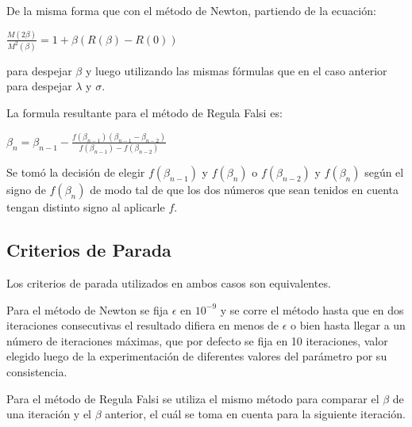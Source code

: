 De la misma forma que con el m\'etodo de Newton, partiendo de la ecuaci\'on:

$\frac{M(2\beta)}{M^2(\beta)}=1 + \beta(R(\beta)-R(0))$

para despejar $\beta$ y luego utilizando las mismas f\'ormulas que en el caso anterior para despejar $\lambda$ y $\sigma$.

La formula resultante para el m\'etodo de Regula Falsi es:

$\beta_n = \beta_{n-1} - \frac{f(\beta_{n-1}) (\beta_{n-1}-\beta_{n-2})}{f(\beta_{n-1}) - f(\beta_{n-2})}$

Se tom\'o la decisi\'on de elegir $f(\beta_{n-1})$ y $f(\beta_n)$ o $f(\beta_{n-2})$ y $f(\beta_n)$ seg\'un el signo de $f(\beta_n)$ de modo tal de que los dos n\'umeros que sean tenidos en cuenta tengan distinto signo al aplicarle $f$.

\subsection{Criterios de Parada}

Los criterios de parada utilizados en ambos casos son equivalentes.

Para el m\'etodo de Newton se fija $\epsilon$ en $10^{-9}$ y se corre el m\'etodo hasta que en dos iteraciones consecutivas el resultado difiera en menos de $\epsilon$ o bien hasta llegar a un n\'umero de iteraciones m\'aximas, que por defecto se fija en 10 iteraciones, valor elegido luego de la experimentaci\'on de diferentes valores del par\'ametro por su consistencia.

Para el m\'etodo de Regula Falsi se utiliza el mismo m\'etodo para comparar el $\beta$ de una iteraci\'on y el $\beta$ anterior, el cu\'al se toma en cuenta para la siguiente iteraci\'on. 

